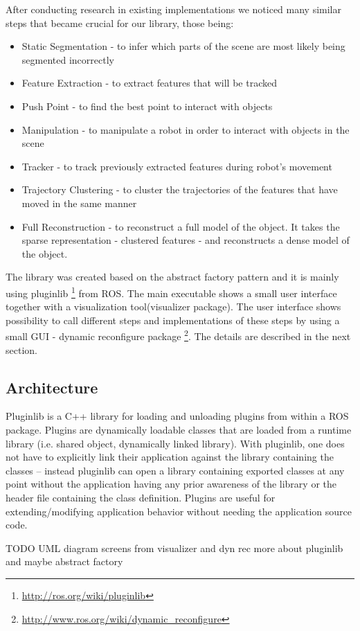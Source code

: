 After conducting research in existing implementations we noticed many similar steps that became crucial for our library, those being:

\begin{itemize}
\item Static Segmentation - to infer which parts of the scene are most likely being segmented incorrectly
\item Feature Extraction - to extract features that will be tracked
\item Push Point - to find the best point to interact with objects
\item Manipulation - to manipulate a robot in order to interact with objects in the scene
\item Tracker - to track previously extracted features during robot's movement
\item Trajectory Clustering - to cluster the trajectories of the features that have moved in the same manner
\item Full Reconstruction - to reconstruct a full model of the object. It takes the sparse representation - clustered features - and reconstructs a dense model of the object.
\end{itemize}




The library was created based on the abstract factory pattern and it is mainly using pluginlib \footnote{\url{http://ros.org/wiki/pluginlib}} from ROS. The main executable  shows a small user interface together with a visualization tool(visualizer package). The user interface shows possibility to call different steps and implementations of these steps by using a small GUI - dynamic reconfigure package \footnote{\url{http://www.ros.org/wiki/dynamic_reconfigure}}. The details are described in the next section.

\subsection{Architecture}

Pluginlib is a C++ library for loading and unloading plugins from within a ROS package. Plugins are dynamically loadable classes that are loaded from a runtime library (i.e. shared object, dynamically linked library). With pluginlib, one does not have to explicitly link their application against the library containing the classes -- instead pluginlib can open a library containing exported classes at any point without the application having any prior awareness of the library or the header file containing the class definition. Plugins are useful for extending/modifying application behavior without needing the application source code. 

TODO		
 UML diagram
 screens from visualizer and dyn rec
 more about pluginlib and maybe abstract factory
